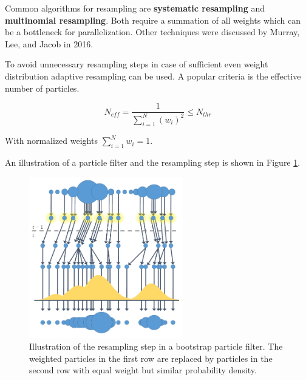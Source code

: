 Common algorithms for resampling are \textbf{systematic resampling} and \textbf{multinomial resampling}.\cite{Doucet2011} Both require a summation of all weights which can be a bottleneck for parallelization. Other techniques were discussed by Murray, Lee, and Jacob in 2016.\cite{parallel_resampling}

To avoid unnecessary resampling steps in case of sufficient even weight distribution adaptive resampling can be used.\cite{Moral2012} A popular criteria is the effective number of particles.

\[{\hat{N}}_{\mathit{eff}} = \frac{1}{\sum_{i=1}^N\left(w_i\right)^2} \leq N_\mathit{thr}\]

With normalized weights \(\sum_{i=1}^N{w_i} = 1\).

An illustration of a particle filter and the resampling step is shown in Figure \ref{fig:resampling}.

\begin{figure}[hbt!]
    \centering
    \includegraphics[width=0.6\textwidth]{figures/resampling.png}
    \caption{Illustration of the resampling step in a bootstrap particle filter. The weighted particles in the first row are replaced by particles in the second row with equal weight but similar probability density.\cite{resampling_image}}
    \label{fig:resampling}
\end{figure}
